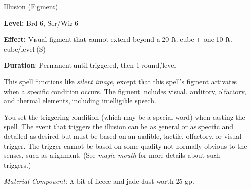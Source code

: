 
Illusion (Figment)

\textbf{Level:} Brd 6, Sor/Wiz 6

\textbf{Effect:} Visual figment that cannot extend beyond a 20-ft. cube + one 10-ft. 
cube/level (S)

\textbf{Duration:} Permanent until triggered, then 1 round/level

This spell functions like \textit{silent image}, except that this spell's figment 
activates when a specific condition occurs. The figment includes visual, auditory, 
olfactory, and thermal elements, including intelligible speech.

You set the triggering condition (which may be a special word) when casting the 
spell. The event that triggers the illusion can be as general or as specific and 
detailed as desired but must be based on an audible, tactile, olfactory, or visual 
trigger. The trigger cannot be based on some quality not normally obvious to the 
senses, such as alignment. (See \textit{magic mouth} for more details about such 
triggers.)

\textit{Material Component:} A bit of fleece and jade dust worth 25 gp.

